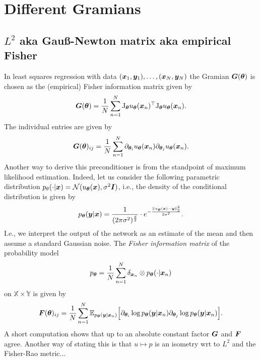 \section{Different Gramians}

\subsection{$L^2$ aka Gauß-Newton matrix aka empirical Fisher}

In least squares regression with data $({\bm{x}}_1, {\bm{y}}_1), \dots, ({\bm{x}}_N, {\bm{y}}_N)$ the Gramian ${\bm{G}}({\bm{\theta}})$ is chosen as the (empirical) Fisher information matrix given by~\citep{martens2020new, eschenhagen2023kroneckerfactored}
\begin{equation}
  {\bm{G}}({\bm{\theta}}) = \frac1N\sum_{n=1}^N \mathrm{J}_{{\bm{\theta}}} u_{{\bm{\theta}}}({\bm{x}}_n)^\top \mathrm{J}_{{\bm{\theta}}} u_{{\bm{\theta}}}({\bm{x}}_n).
 \end{equation}
 The individual entries are given by 
\begin{equation}
  {\bm{G}}({\bm{\theta}})_{ij} = \frac1N\sum_{n=1}^N \partial_{{\bm{\theta}}_i} u_{{\bm{\theta}}}({\bm{x}}_n) \partial_{{\bm{\theta}}_j} u_{{\bm{\theta}}}({\bm{x}}_n). 
\end{equation}
Another way to derive this preconditioner is from the standpoint of maximum likelihood estimation.
Indeed, let us consider the following parametric distribution $p_\theta(\cdot|{\bm{x}}) = \mathcal N(u_{\bm{\theta}}({\bm{x}}), \sigma^2{\bm{I}})$, i.e., the density of the conditional distribution is given by 
\begin{align}
    p_{\bm{\theta}}({\bm{y}}|{\bm{x}}) = \frac1{(2\pi\sigma^2)^{\frac{d}2}} \cdot e^{-\frac{\lVert u_{\bm{\theta}}({\bm{x}}) - {\bm{y}} \rVert_2^2}{2\sigma^2}}. 
\end{align}
I.e., we interpret the output of the network as an estimate of the mean and then assume a standard Gaussian noise. 
The \emph{Fisher information matrix} of the probability model 
\begin{align}
    p_{\bm{\theta}} = \frac1N \sum_{n=1}^N \delta_{{\bm{x}}_n}\otimes p_{\bm{\theta}}(\cdot|{\bm{x}}_n)
\end{align}
on $\mathbb X\times\mathbb Y$ is given by 
\begin{align}
    {{\bm{F}}}({\bm{\theta}})_{ij} = \frac1N\sum_{n=1}^N  \mathbb E_{p_{\bm{\theta}}({\bm{y}}|{\bm{x}}_n)}\Big[\partial_{{\bm{\theta}}_i} \log p_{{\bm{\theta}}}({\bm{y}}|{\bm{x}}_n) \partial_{{\bm{\theta}}_j} \log p_{{\bm{\theta}}}({\bm{y}}|{\bm{x}}_n)\Big]. 
\end{align}
A short computation shows that up to an absolute constant factor ${\bm{G}}$ and ${{\bm{F}}}$ agree. 
Another way of stating this is that $u\mapsto p$ is an isometry wrt to $L^2$ and the Fisher-Rao metric... 
\todo{}


